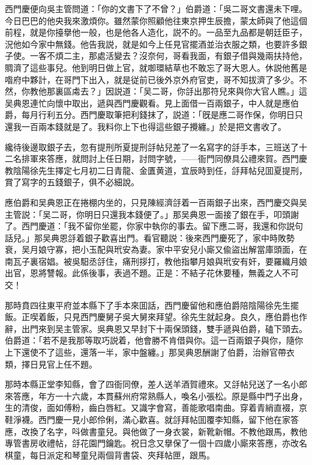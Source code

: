 西門慶便向吳主管問道：「你的文書下了不曾？」伯爵道：「吳二哥文書還未下哩。今日巴巴的他央我來激煩你。雖然蒙你照顧他往東京押生辰擔，蒙太師與了他這個前程，就是你擡擧他一般，也是他各人造化，説不的。一品至九品都是朝廷臣子，況他如今家中無錢。他告我説，就是如今上任見官擺酒並治衣服之類，也要許多銀子使。一客不煩二主，那處活變去？沒奈何，哥看我面，有銀子借與幾兩扶持他，賙濟了這些事兒。他到明日做上官，就啣環結草也不敢忘了哥大恩人。休説他舊是喒府中夥計，在哥門下出入，就是従前已後外京外府官吏，哥不知拔濟了多少。不然，你教他那裏區䖏去？」因説道：「吴二哥，你㧱出那符兒來與你大官人瞧。」這吴典恩連忙向懷中取出，遞與西門慶觀看。見上面借一百兩銀子，中人就是應伯爵，每月行利五分。西門慶取筆把利錢抹了，説道：「旣是應二哥作保，你明日只還我一百兩本錢就是了。我料你上下也得這些銀子攪纏。」於是把文書收了。

纔待後邊取銀子去，忽有提刑所夏提刑㧱帖兒差了一名寫字的㧱手本，三班送了十二名排軍來答應，就問討上任日期，討問字號，——衙門同僚具公禮來賀。西門慶教陰陽徐先生擇定七月初二日青龍、金匱黄道，宜辰時到任，㧱拜帖兒囬夏提刑，賞了寫字的五錢銀子，俱不必細說。

應伯爵和吴典恩正在捲棚内坐的，只見陳經濟㧱着一百兩銀子出來，西門慶交與吴主管説：「吴二哥，你明日只還我本錢便了。」那吴典恩一面接了銀在手，叩頭謝了。西門慶道：「我不留你坐罷，你家中執你的事去。留下應二哥，我還和你説句話兒。」那吴典恩㧱着銀子歡喜出門。看官聽説：後來西門慶死了，家中時敗勢衰，吴月娘守寡，把小玉配與玳安為妻。家中平安兒小廝又偸盜出解當庫頭面，在南瓦子裏宿娼。被吳馹丞㧱住，痛刑拶打，教他指攀月娘與玳安有奸，要羅織月娘出官，恩將讐報。此係後事，表過不題。正是：不結子花休要種，無義之人不可交！

那時賁四往東平府並本縣下了手本來囬話，西門慶留他和應伯爵陪陰陽徐先生擺飯。正喫着飯，只見西門慶舅子吳大舅來拜望。徐先生就起身。良久，應伯爵也作辭，出門來到吴主管家。吳典恩又早封下十兩保頭錢，雙手遞與伯爵，磕下頭去。伯爵道：「若不是我那等取巧説着，他會勝不肯借與你。這一百兩銀子與你，隨你上下還使不了這些，還落一半，家中盤纏。」那吴典恩酬謝了伯爵，治辦官帶衣類，擇日見官上任不題。

那時本縣正堂李知縣，會了四衙同僚，差人送羊酒賀禮來。又㧱帖兒送了一名小郎來答應，年方一十六歲，本貫蘇州府常熟縣人，喚名小張松。原是縣中門子出身，生的清俊，面如傅粉，齒白唇紅。又識字會寫，善能歌唱南曲。穿着青綃直裰，京鞋淨襪。西門慶一見小郎伶俐，滿心歡喜。就㧱拜帖囬覆李知縣，留下他在家答應，改換了名字，呌做書童兒。與他做了一身衣裳，新靴新帽。不教他跟馬，教他專管書房收禮帖，㧱花園門鑰匙。祝日念又擧保了一個十四歲小廝來答應，亦改名棋童，每日派定和琴童兒兩個背書袋、夾拜帖匣，跟馬。

